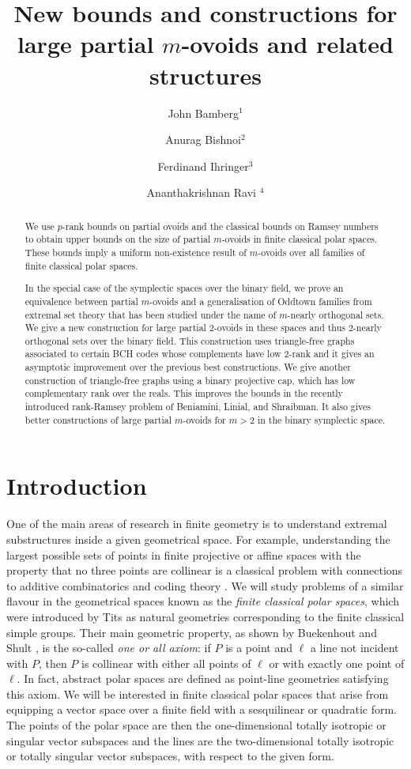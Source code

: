 \documentclass[a4paper,11pt]{amsproc}
\title{New bounds and constructions for large partial $m$-ovoids and related structures}
\author[Bamberg]{John Bamberg$^1$}
\author[Bishnoi]{Anurag Bishnoi$^2$}
\author[Ihringer]{Ferdinand Ihringer$^3$}
\author[Ravi]{Ananthakrishnan Ravi $^4$}
\theoremstyle{plain}
\theoremstyle{definition}
\newcommand{\<}{\langle}
\renewcommand{\>}{\rangle} %
\begin{document}
\begin{abstract}
  We use $p$-rank bounds on partial ovoids and the classical bounds on Ramsey numbers to obtain upper bounds on the size of partial $m$-ovoids in finite classical polar spaces. These bounds imply a uniform non-existence result of $m$-ovoids over all families of finite classical polar spaces.
  
In the special case of the symplectic spaces over the binary field, we prove an equivalence between partial $m$-ovoids and a generalisation of Oddtown families from extremal set theory that has been studied under the name of $m$-nearly orthogonal sets. We give a new construction for large partial $2$-ovoids in these spaces and thus $2$-nearly orthogonal sets over the binary field. 
This construction uses triangle-free graphs associated to certain BCH codes whose complements have low $2$-rank and it gives an asymptotic improvement over the previous best constructions.
We give another construction of triangle-free graphs using a binary projective cap, which has low complementary rank over the reals.
This improves the bounds in the recently introduced rank-Ramsey problem of Beniamini, Linial, and Shraibman.
It also gives better constructions of large partial $m$-ovoids for $m > 2$ in the binary symplectic space.
\end{abstract}

\maketitle


\section{Introduction}
One of the main areas of research in finite geometry is to understand extremal substructures inside a given geometrical space. 
For example, understanding the largest possible sets of points in finite projective or affine spaces with the property that no three points are collinear is a classical problem with connections to additive combinatorics \cite{Alon13, EG17} and coding theory \cite{Hill78}. 
We will study problems of a similar flavour in the geometrical spaces known as the \textit{finite classical polar spaces}, which were introduced by Tits \cite{Tits1959} as natural geometries corresponding to the finite classical simple groups. 
Their main geometric property, as shown by Buekenhout and Shult \cite{BS74}, is the so-called \emph{one or all axiom}: if $P$ is a point and $\ell$ a line not incident with $P$, then 
$P$ is collinear with either all points of $\ell$ or with exactly one point of $\ell$. 
In fact, abstract polar spaces are defined as point-line geometries satisfying this axiom. 
We will be interested in finite classical polar spaces that arise from
equipping a vector space over a finite field with a sesquilinear or quadratic form. 
The points of the polar space are then the one-dimensional totally isotropic or singular vector subspaces and the lines are the two-dimensional totally isotropic or totally singular vector subspaces, with respect to the given form. 
\end{document}
